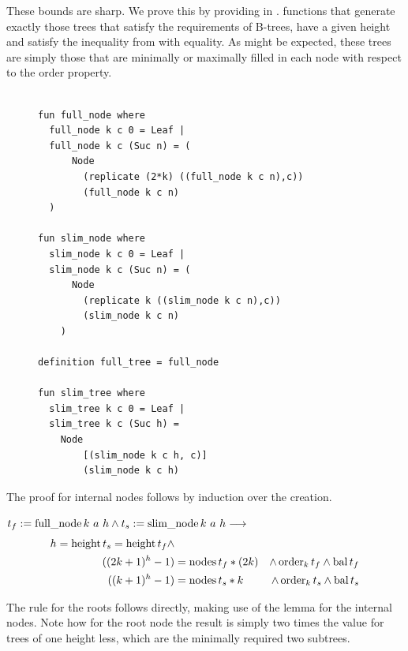 These bounds are sharp.
We prove this by providing in .
functions that generate exactly those trees
that satisfy the requirements of B-trees, have a given height
and satisfy the inequality from 
with equality.
As might be expected, these trees are simply those
that are minimally or maximally filled in each node with respect
to the order property.

\begin{figure}
\begin{lstlisting}[mathescape=true, language=Isabelle,label={lst:sharp-trees-def},
    caption={The functions generating trees with minimal size and maximal size for given height.}]

fun full_node where
  full_node k c 0 = Leaf |
  full_node k c (Suc n) = (
      Node
        (replicate (2*k) ((full_node k c n),c))
        (full_node k c n)
  )

fun slim_node where
  slim_node k c 0 = Leaf |
  slim_node k c (Suc n) = (
      Node
        (replicate k ((slim_node k c n),c))
        (slim_node k c n)
    )

definition full_tree = full_node

fun slim_tree where
  slim_tree k c 0 = Leaf |
  slim_tree k c (Suc h) =
    Node
        [(slim_node k c h, c)]
        (slim_node k c h)

\end{lstlisting}
\end{figure}

The proof for internal nodes follows by induction over the creation.

\begin{lemma} $t_f := \operatorname{full\_node} k\ a\ h \wedge t_s := \operatorname{slim\_node} k\ a\ h \longrightarrow$
    \begin{align}
    h = \operatorname{height} t_s = \operatorname{height} t_f \wedge \\
    ((2k+1)^h - 1) &= \operatorname{nodes} t_f * (2k) &\wedge \operatorname{order}_k t_f \wedge \operatorname{bal} t_f \\ 
    ((k+1)^h - 1) &= \operatorname{nodes} t_s * k  &\wedge \operatorname{order}_k t_s \wedge \operatorname{bal} t_s
    \end{align}
\end{lemma}

The rule for the roots follows directly, making use of the lemma
for the internal nodes.
Note how for the root node the result is simply two times the
value for trees of one height less, which are the minimally
required two subtrees.

